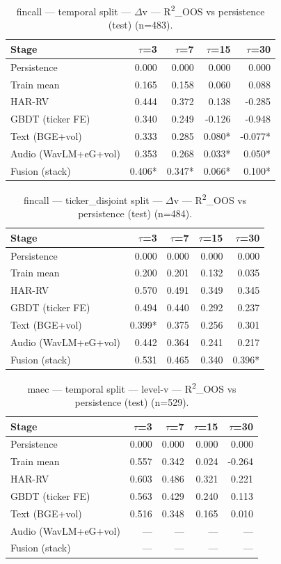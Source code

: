 \begin{table}[t]
\centering
\begin{tabular}{lrrrr}
\toprule
Stage & $\tau$=3 & $\tau$=7 & $\tau$=15 & $\tau$=30 \\
\midrule
Persistence & 0.000 & 0.000 & 0.000 & 0.000 \\
Train mean & 0.165 & 0.158 & 0.060 & 0.088 \\
HAR-RV & 0.444 & 0.372 & 0.138 & -0.285 \\
GBDT (ticker FE) & 0.340 & 0.249 & -0.126 & -0.948 \\
Text (BGE+vol) & 0.333 & 0.285 & 0.080* & -0.077* \\
Audio (WavLM+eG+vol) & 0.353 & 0.268 & 0.033* & 0.050* \\
Fusion (stack) & 0.406* & 0.347* & 0.066* & 0.100* \\
\bottomrule
\end{tabular}
\caption{fincall — temporal split — $\Delta$v — R\textsuperscript{2}\_OOS vs persistence (test) (n=483).}
\end{table}

\begin{table}[t]
\centering
\begin{tabular}{lrrrr}
\toprule
Stage & $\tau$=3 & $\tau$=7 & $\tau$=15 & $\tau$=30 \\
\midrule
Persistence & 0.000 & 0.000 & 0.000 & 0.000 \\
Train mean & 0.200 & 0.201 & 0.132 & 0.035 \\
HAR-RV & 0.570 & 0.491 & 0.349 & 0.345 \\
GBDT (ticker FE) & 0.494 & 0.440 & 0.292 & 0.237 \\
Text (BGE+vol) & 0.399* & 0.375 & 0.256 & 0.301 \\
Audio (WavLM+eG+vol) & 0.442 & 0.364 & 0.241 & 0.217 \\
Fusion (stack) & 0.531 & 0.465 & 0.340 & 0.396* \\
\bottomrule
\end{tabular}
\caption{fincall — ticker\_disjoint split — $\Delta$v — R\textsuperscript{2}\_OOS vs persistence (test) (n=484).}
\end{table}

\begin{table}[t]
\centering
\begin{tabular}{lrrrr}
\toprule
Stage & $\tau$=3 & $\tau$=7 & $\tau$=15 & $\tau$=30 \\
\midrule
Persistence & 0.000 & 0.000 & 0.000 & 0.000 \\
Train mean & 0.557 & 0.342 & 0.024 & -0.264 \\
HAR-RV & 0.603 & 0.486 & 0.321 & 0.221 \\
GBDT (ticker FE) & 0.563 & 0.429 & 0.240 & 0.113 \\
Text (BGE+vol) & 0.516 & 0.348 & 0.165 & 0.010 \\
Audio (WavLM+eG+vol) & — & — & — & — \\
Fusion (stack) & — & — & — & — \\
\bottomrule
\end{tabular}
\caption{maec — temporal split — level-v — R\textsuperscript{2}\_OOS vs persistence (test) (n=529).}
\end{table}

